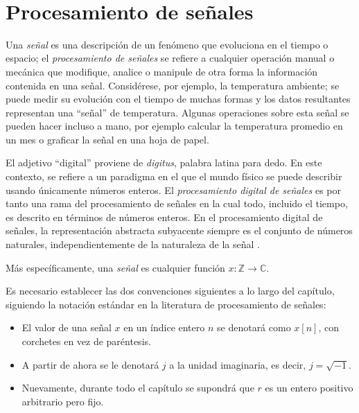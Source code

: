 \newpage
\thispagestyle{empty}
\
\newpage
\section{Procesamiento de señales}

Una \emph{señal} es una descripción de un fenómeno que evoluciona en el tiempo o espacio; el \emph{procesamiento de señales} se refiere a cualquier operación manual o mecánica que modifique, analice o manipule de otra forma la información contenida en una señal. Considérese, por ejemplo, la temperatura ambiente; se puede medir su evolución con el tiempo de muchas formas y los datos resultantes representan una ``señal'' de temperatura. Algunas operaciones sobre esta señal se pueden hacer incluso a mano, por ejemplo calcular la temperatura promedio en un mes o graficar la señal en una hoja de papel.

\bigskip

El adjetivo ``digital'' proviene de \emph{digitus}, palabra latina para dedo. En este contexto, se refiere a un paradigma en el que el mundo físico se puede describir usando únicamente números enteros.
El \emph{procesamiento digital de señales} es por tanto una rama del procesamiento de señales en la cual todo, incluido el tiempo, es descrito en términos de números enteros. En el procesamiento digital de señales, la representación abstracta subyacente siempre es el conjunto de números naturales, independientemente de la naturaleza de la señal \cite{Prand1}.

\begin{definition}
Más específicamente, una \emph{señal} es cualquier función $x : \mathbb{Z} \longrightarrow \mathbb{C}$.
\end{definition}

\begin{remark}
Es necesario establecer las dos convenciones siguientes a lo largo del capítulo, siguiendo la notación estándar en la literatura de procesamiento de señales:
\begin{itemize}
\item El valor de una señal $x$ en un índice entero $n$ se denotará como $x[n]$, con corchetes en vez de paréntesis.
\item A partir de ahora se le denotará $j$ a la unidad imaginaria, es decir, $j = \sqrt{-1}$.
\item Nuevamente, durante todo el capítulo se supondrá que $r$ es un entero positivo arbitrario pero fijo.
\end{itemize}
\end{remark}

